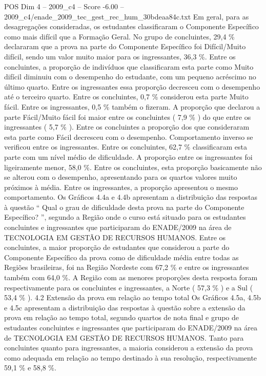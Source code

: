 \begin{textsample}{POS Dim 4 – 2009\_c4 – Score -6.00 – 2009\_c4/enade\_2009\_tec\_gest\_rec\_hum\_30bdeaa84c.txt}
Em geral, para as desagregações consideradas, os estudantes classificaram o Componente Específico como mais difícil que a Formação Geral.
No grupo de concluintes, 29,4 \% declararam que a prova na parte do Componente Específico foi Difícil/Muito difícil, sendo um valor muito maior para os ingressantes, 36,3 \%.
Entre os concluintes, a proporção de indivíduos que classificaram esta parte como Muito difícil diminuiu com o desempenho do estudante, com um pequeno acréscimo no último quarto.
Entre os ingressantes essa proporção decresceu com o desempenho até o terceiro quarto.
Entre os concluintes, 0,7 \% considerou esta parte Muito fácil.
Entre os ingressantes, 0,5 \% também o fizeram.
A proporção que declarou a parte Fácil/Muito fácil foi maior entre os concluintes ( 7,9 \% ) do que entre os ingressantes ( 5,7 \% ).
Entre os concluintes a proporção dos que consideraram esta parte como Fácil decresceu com o desempenho.
Comportamento inverso se verificou entre os ingressantes.
Entre os concluintes, 62,7 \% classificaram esta parte com um nível médio de dificuldade.
A proporção entre os ingressantes foi ligeiramente menor, 58,0 \%.
Entre os concluintes, esta proporção basicamente não se alterou com o desempenho, apresentando para os quartos valores muito próximos à média.
Entre os ingressantes, a proporção apresentou o mesmo comportamento.
Os Gráficos 4.4a e 4.4b apresentam a distribuição das respostas à questão “ Qual o grau de dificuldade desta prova na parte do Componente Específico? ”, segundo a Região onde o curso está situado para os estudantes concluintes e ingressantes que participaram do ENADE/2009 na área de TECNOLOGIA EM GESTÃO DE RECURSOS HUMANOS.
Entre os concluintes, a maior proporção de estudantes que considerou a parte do Componente Específico da prova como de dificuldade média entre todas as Regiões brasileiras, foi na Região Nordeste com 67,2 \% e entre os ingressantes também com 64,0 \%.
A Região com as menores proporções desta resposta foram respectivamente para os concluintes e ingressantes, a Norte ( 57,3 \% ) e a Sul ( 53,4 \% ). 4.2 Extensão da prova em relação ao tempo total Os Gráficos 4.5a, 4.5b e 4.5c apresentam a distribuição das respostas à questão sobre a extensão da prova em relação ao tempo total, segundo quartos de nota final e grupo de estudantes concluintes e ingressantes que participaram do ENADE/2009 na área de TECNOLOGIA EM GESTÃO DE RECURSOS HUMANOS.
Tanto para concluintes quanto para ingressantes, a maioria considerou a extensão da prova como adequada em relação ao tempo destinado à sua resolução, respectivamente 59,1 \% e 58,8 \%.

\end{textsample}
